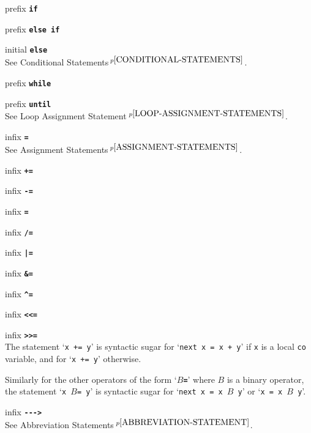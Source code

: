 \documentclass[12pt]{article}
\newcommand{\TT}[1]{{\tt \bfseries #1}}
\newcommand{\pagnote}[1]{$\,^{p\pageref{#1}}$}
\newenvironment{itemlist}[1][1.2in]%
	{\begin{list}{}{\setlength{\labelwidth}{#1}%
		        \setlength{\leftmargin}{\labelwidth}%
		        \addtolength{\leftmargin}{+0.2in}%
		        \renewcommand{\makelabel}[1]{##1\hfill}}}%
	{\end{list}}
\begin{document}
\begin{itemlist}[0.2in]
\item[prefix \TT{if}]
\item[prefix \TT{else if}] \vspace*{-0.15in}
\item[initial \TT{else}] \vspace*{-0.15in} ~\\
See Conditional Statements\pagnote{CONDITIONAL-STATEMENTS}.

\item[prefix \TT{while}]
\item[prefix \TT{until}] \vspace*{-0.15in} ~\\
See Loop Assignment Statement\pagnote{LOOP-ASSIGNMENT-STATEMENTS}.

\item[infix \TT{=}] ~\\
See Assignment Statements\pagnote{ASSIGNMENT-STATEMENTS}.

\item[infix \TT{+=}]
\item[infix \TT{-=}] \vspace*{-0.15in}
\item[infix \TT{*=}] \vspace*{-0.15in}
\item[infix \TT{/=}] \vspace*{-0.15in}
\item[infix \TT{|=}] \vspace*{-0.15in}
\item[infix \TT{\&=}] \vspace*{-0.15in}
\item[infix \TT{\textasciicircum=}] \vspace*{-0.15in}
\item[infix \TT{<{}<{}=}] \vspace*{-0.15in}
\item[infix \TT{>{}>{}=}] \vspace*{-0.15in} ~\\
The statement `{\tt x += y}' is syntactic sugar for `{\tt next x = x + y}'
if {\tt x} is a local {\tt co} variable, and for
`{\tt x += y}' otherwise.

Similarly for the other operators of the form `\TT{$B$=}'
where $B$ is a binary operator,
the statement `{\tt x $B$= y}' is syntactic sugar for
`{\tt next x = x $B$ y}' or `{\tt x = x $B$ y}'.

\item[infix \TT{-{}-{}-{}>}] ~\\
See Abbreviation Statements\pagnote{ABBREVIATION-STATEMENT}.


\end{itemlist}
\end{document}
